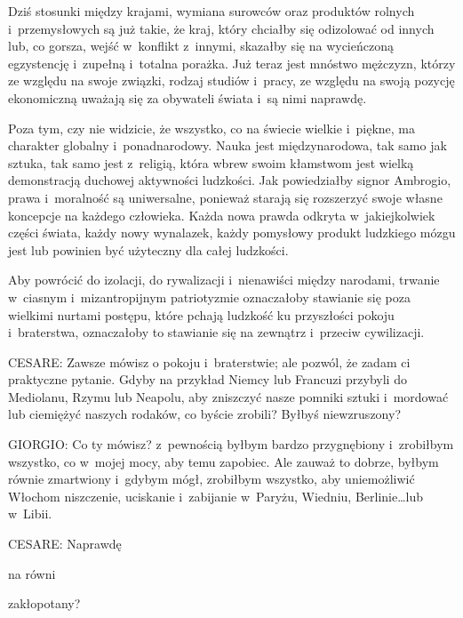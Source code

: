 \documentclass[oneside,polish,11pt,sfheadings]{mwbk}
\begin{document}
 
Dziś stosunki między krajami, wymiana surowców oraz produktów rolnych i~przemysłowych są już takie, że kraj, który
chciałby się odizolować od innych lub, co gorsza, wejść w~konflikt z~innymi, skazałby się na wycieńczoną egzystencję i~zupełną i~totalna porażka. Już teraz jest mnóstwo mężczyzn, którzy ze względu na swoje związki, rodzaj studiów i~pracy,
ze względu na swoją pozycję ekonomiczną uważają się za obywateli świata i~są nimi naprawdę. 

 
Poza tym, czy nie widzicie, że wszystko, co na świecie wielkie i~piękne, ma charakter globalny i~ponadnarodowy. Nauka
jest międzynarodowa, tak samo jak sztuka, tak samo jest z~religią, która wbrew swoim kłamstwom jest wielką demonstracją
duchowej aktywności ludzkości. Jak powiedziałby signor Ambrogio, prawa i~moralność są uniwersalne, ponieważ starają się
rozszerzyć swoje własne koncepcje na każdego człowieka. Każda nowa prawda odkryta w~jakiejkolwiek części świata, każdy
nowy wynalazek, każdy pomysłowy produkt ludzkiego mózgu jest lub powinien być użyteczny dla całej ludzkości. 

 
Aby powrócić do izolacji, do rywalizacji i~nienawiści między narodami, trwanie w~ciasnym i~mizantropijnym patriotyzmie
oznaczałoby stawianie się poza wielkimi nurtami postępu, które pchają ludzkość ku przyszłości pokoju i~braterstwa,
oznaczałoby to stawianie się na zewnątrz i~przeciw cywilizacji. 




 
\noindent CESARE: Zawsze mówisz o pokoju i~braterstwie; ale pozwól, że zadam ci praktyczne pytanie. Gdyby na przykład Niemcy lub
Francuzi przybyli do Mediolanu, Rzymu lub Neapolu, aby zniszczyć nasze pomniki sztuki i~mordować lub ciemiężyć naszych
rodaków, co byście zrobili? Byłbyś niewzruszony? 




 
\noindent GIORGIO: Co ty mówisz? z~pewnością byłbym bardzo przygnębiony i~zrobiłbym wszystko, co w~mojej mocy, aby temu zapobiec.
Ale zauważ to dobrze, byłbym równie zmartwiony i~gdybym mógł, zrobiłbym wszystko, aby uniemożliwić Włochom niszczenie,
uciskanie i~zabijanie w~Paryżu, Wiedniu, Berlinie\ldots lub w~Libii. 




 
\noindent CESARE: Naprawdę \begin{itshape}na równi \end{itshape} zakłopotany? 
\end{document}
